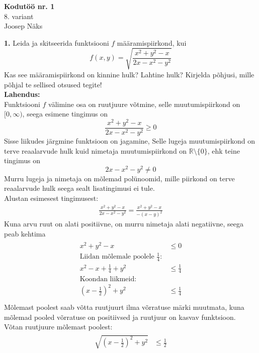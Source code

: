 \documentclass{article}
\begin{document}
\begin{center}
\Large\textbf{Kodutöö nr. 1}\\
8. variant\\
\small{Joosep Näks}
\end{center}
\textbf{1. } Leida ja skitseerida funktsiooni $f$ määramispiirkond, kui
\begin{equation*}
f(x,y)=\sqrt{\frac{x^2+y^2-x}{2x-x^2-y^2}}
\end{equation*}
Kas see määramispiirkond on kinnine hulk? Lahtine hulk? Kirjelda põhjusi, mille põhjal te sellised otsused tegite!\\
\textbf{Lahendus:}\\
Funktsiooni $f$ välimine osa on ruutjuure võtmine, selle muutumispiirkond on $[0,\infty)$, seega esimene tingimus on
\begin{equation}
\frac{x^2+y^2-x}{2x-x^2-y^2}\geq0
\end{equation}
Sisse liikudes järgmine funktsioon on jagamine, Selle lugeja muutumispiirkond on terve reaalarvude hulk kuid nimetaja muutumispiirkond on $\mathbb{R}\setminus\{0\}$, ehk teine tingimus on
\begin{equation}
2x-x^2-y^2\neq0
\end{equation}
Murru lugeja ja nimetaja on mõlemad polünoomid, mille piirkond on terve reaalarvude hulk seega sealt lisatingimusi ei tule.\\
Alustan esimesest tingimusest:
\begin{gather*}
\frac{x^2+y^2-x}{2x-x^2-y^2}=\frac{x^2+y^2-x}{-(x-y)^2}
\end{gather*}
Kuna arvu ruut on alati positiivne, on murru nimetaja alati negatiivne, seega peab kehtima
\begin{gather*}
\begin{aligned}
x^2+y^2-x&\leq0\\
\text{Liidan mõlemale poolele } \frac{1}{4}:\\
x^2-x+\frac{1}{4}+y^2&\leq\frac{1}{4}\\
\text{Koondan liikmeid:}\\
\left(x-\frac{1}{2}\right)^2+y^2&\leq\frac{1}{4}\\
\end{aligned}
\end{gather*}
Mõlemast poolest saab võtta ruutjuurt ilma võrratuse märki muutmata, kuna mõlemad pooled võrratuse on positiivsed ja ruutjuur on kasvav funktsioon.\\
Võtan ruutjuure mõlemast poolest:
\begin{gather*}
\begin{aligned}
\sqrt{\left(x-\frac{1}{2}\right)^2+y^2}&\leq\frac{1}{2}\\
\end{aligned}
\end{gather*}
\end{document}
